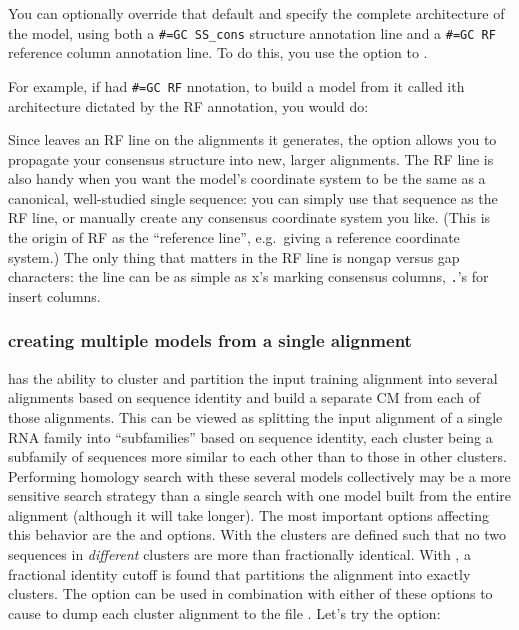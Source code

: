You can optionally override that default and specify the complete
architecture of the model, using both a {\small\verb+#=GC SS_cons+}
structure annotation line and a {\small\verb+#=GC RF+} reference
column annotation line.  To do this, you use the  option to
.

For example, if  had {\small\verb+#=GC RF+}
nnotation, to build a model from it called  
ith architecture dictated by the RF annotation, you
would do:


Since  leaves an RF line on the alignments it generates,
the  option allows you to propagate your consensus
structure into new, larger alignments. The RF line is also handy when
you want the model's coordinate system to be the same as a canonical,
well-studied single sequence: you can simply use that sequence as the
RF line, or manually create any consensus coordinate system you like.
(This is the origin of RF as the ``reference line'', e.g.\ giving a
reference coordinate system.) The only thing that matters in the RF
line is nongap versus gap characters: the line can be as simple as x's
marking consensus columns, \verb+.+'s for insert columns.

\subsubsection{creating multiple models from a single alignment}
 has the ability to cluster and partition the input training
alignment into several alignments based on sequence identity and build
a separate CM from each of those alignments. This can be viewed as splitting
the input alignment of a single RNA family into ``subfamilies'' based on
sequence identity, each cluster being a subfamily of sequences more
similar to each other than to those in other clusters.
Performing homology search with these several models
collectively may be a more sensitive search strategy than a single
search with one model built from the entire alignment (although it
will take longer). The most important options affecting this behavior
are the  and  options. With
 the clusters are defined such that no two
sequences in \emph{different} clusters are more than 
fractionally identical. With , a fractional identity
cutoff is found that partitions the alignment into exactly 
clusters. The  option can be used in combination
with either of these options to cause  to dump each
cluster alignment to the file . Let's try the 
 option: 

